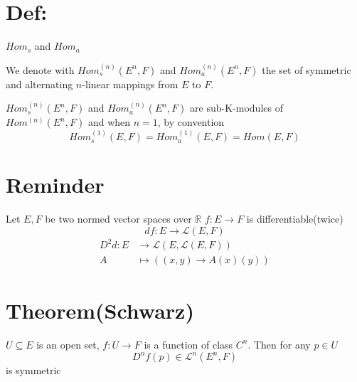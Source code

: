 \documentclass{book}
\begin{document}
\section{Def:}
$Hom_s$ and $Hom_a$

We denote with $Hom_s^{(n)}(E^n,F)$ and $Hom_a^{(n)}(E^n,F)$ the set of symmetric and alternating $n$-linear mappings from $E$ to $F$. 

$Hom^{(n)}_s(E^n,F)$ and $Hom^{(n)}_a(E^n,F)$ are sub-K-modules of $Hom^{(n)}(E^n,F)$ and when $n=1$, by convention$$Hom^{(1)}_s(E,F)=Hom^{(1)}_a(E,F)=Hom(E,F)$$

\section{Reminder}
 Let $E,F$ be two normed vector spaces over $\mathbb{R}$ $f:E\rightarrow F$ is differentiable(twice) $$df:E\rightarrow\mathscr{L}(E,F)$$
 $$
 \begin{aligned}
    D^2d:E &\rightarrow\mathscr{L}(E,\mathscr{L}(E,F))\\
    A &\mapsto ((x,y)\rightarrow A(x)(y))
 \end{aligned}$$
 \section{Theorem(Schwarz)}
 $U\subseteq E$ is an open set, $f:U\rightarrow F$ is a function of class $C^n$. Then for any $p\in U$$$D^nf(p)\in \mathscr{L}^n(E^n,F)$$ is symmetric
\end{document}
